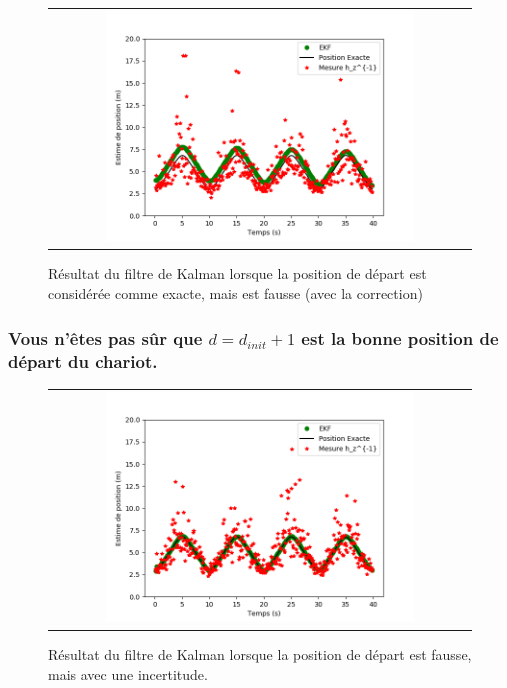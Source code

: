 \documentclass[12pt]{article}
\begin{document}
\begin{figure}[ht]
 \begin{center}
  \begin{tabular}{c}
    \includegraphics[width=0.75\textwidth]{fig/kalman-position-err-certitude-correction.png}
  \end{tabular}
 \end{center}
\vspace{-0.25in}
    \caption{Résultat du filtre de Kalman lorsque la position de départ est considérée comme exacte, mais est fausse (avec la correction)}
    \label{kalman-position-err-certitude-pas-correction}
\end{figure}

\subsubsection{Vous n'êtes pas sûr que $d=d_{init}+1$ est la bonne position de départ du chariot.}

\begin{figure}[ht]
 \begin{center}
  \begin{tabular}{c}
    \includegraphics[width=0.75\textwidth]{fig/kalman-position-err-incertitude.png}
  \end{tabular}
 \end{center}
\vspace{-0.25in}
    \caption{Résultat du filtre de Kalman lorsque la position de départ est fausse, mais avec une incertitude.}
    \label{kalman-position-err-incertitude}
\end{figure}
\end{document}
